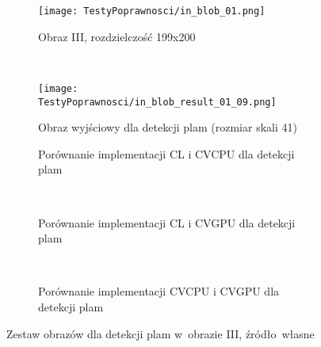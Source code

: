 \begin{figure}[H]

\begin{center}
\begin{subfigure}[t]{0.3\textwidth}
\texttt{[image: TestyPoprawnosci/in\_blob\_01.png]}
\caption{Obraz III, rozdzielczość 199x200}
\label{fig:valBlob01}
\end{subfigure}
~
\begin{subfigure}[t]{0.3\textwidth}
\texttt{[image: TestyPoprawnosci/in\_blob\_result\_01\_09.png]}
\caption{Obraz wyjściowy dla detekcji plam (rozmiar skali 41)}
\label{fig:valBlobResult01}
\end{subfigure}
\end{center}


\begin{subfigure}[t]{0.3\textwidth}
	\centering
	\setlength\fboxsep{0pt}
	\setlength\fboxrule{0.5pt}
	\caption{Porównanie implementacji CL i CVCPU dla detekcji plam}
	\label{fig:valBlob2CLCVCPU}
\end{subfigure}
~
\begin{subfigure}[t]{0.3\textwidth}
	\centering
	\setlength\fboxsep{0pt}
	\setlength\fboxrule{0.5pt}
	\caption{Porównanie implementacji CL i CVGPU dla detekcji plam}
	\label{fig:valBlob2CLCVGPU}
\end{subfigure}
~
\begin{subfigure}[t]{0.3\textwidth}
	\centering
	\setlength\fboxsep{0pt}
	\setlength\fboxrule{0.5pt}
	\caption{Porównanie implementacji CVCPU i CVGPU dla detekcji plam}
	\label{fig:valblob2CVCPUCVGPU}                 
\end{subfigure}
\caption{Zestaw obrazów dla detekcji plam w~obrazie III, \tiny{źródło~własne}}

\label{fig:valBlob1}
\end{figure}

